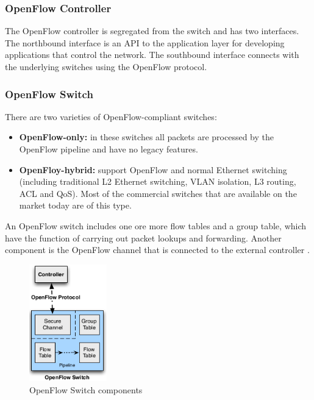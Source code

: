 \subsubsection{OpenFlow Controller}

The OpenFlow controller is segregated from the switch and has two interfaces. The northbound interface is an API to the application layer for developing applications that control the network. The southbound interface connects with the underlying switches using the OpenFlow protocol.

\subsubsection{OpenFlow Switch}

There are two varieties of OpenFlow-compliant switches: \cite{ofspecification}
\begin{itemize}
\item \textbf{OpenFlow-only:} in these switches all packets are processed by the OpenFlow pipeline and have no legacy features.
\item \textbf{OpenFloy-hybrid:} support OpenFlow and normal Ethernet switching (including traditional L2 Ethernet switching, VLAN isolation, L3 routing, ACL and QoS). Most of the commercial switches that are available on the market today are of this type.
\end{itemize}

An OpenFlow switch includes one ore more flow tables and a group table, which have the function of carrying out packet lookups and forwarding. Another component is the OpenFlow channel that is connected to the external controller \cite{ofspecification}.

\begin{figure}[H]
\centering
\includegraphics[width=0.3\textwidth]{images/fundamentals/openflow_switch_components.png}
\caption{OpenFlow Switch components}
\end{figure}

